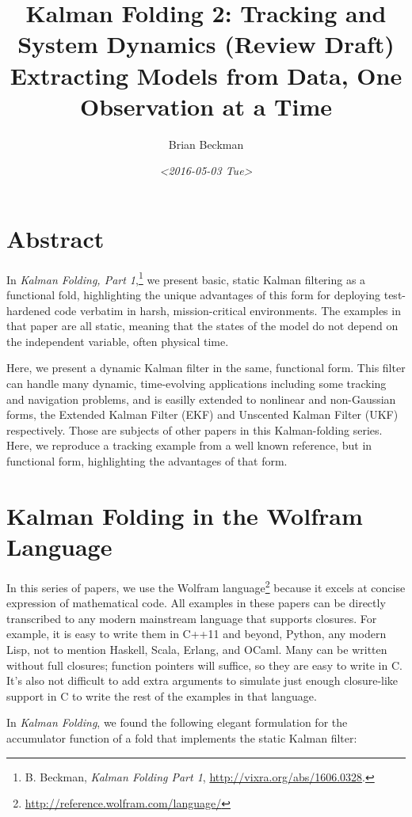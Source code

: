 \documentclass[10pt,oneside,x11names]{article}
\author{Brian Beckman}
\date{\textit{<2016-05-03 Tue>}}
\title{Kalman Folding 2: Tracking and System Dynamics (Review Draft)\\\medskip
\large Extracting Models from Data, One Observation at a Time}
\begin{document}
\maketitle
\setcounter{tocdepth}{2}
\tableofcontents


\section{Abstract}
\label{sec:orgheadline1}

In \emph{Kalman Folding, Part 1},\footnote{B. Beckman, \emph{Kalman Folding Part 1}, \url{http://vixra.org/abs/1606.0328}.} we present basic, static Kalman filtering
as a functional fold, highlighting the unique advantages of this form for
deploying test-hardened code verbatim in harsh, mission-critical environments.
The examples in that paper are all static, meaning that the states of the model
do not depend on the independent variable, often physical time.

Here, we present a dynamic Kalman filter in the same, functional form. This
filter can handle many dynamic, time-evolving applications including some
tracking and navigation problems, and is easilly extended to nonlinear and
non-Gaussian forms, the Extended Kalman Filter (EKF) and Unscented Kalman Filter
(UKF) respectively. Those are subjects of other papers in this Kalman-folding
series. Here, we reproduce a tracking example from a well known reference, but
in functional form, highlighting the advantages of that form.

\section{Kalman Folding in the Wolfram Language}
\label{sec:orgheadline2}

In this series of papers, we use the Wolfram language\footnote{\url{http://reference.wolfram.com/language/}} because it excels
at concise expression of mathematical code. All examples in these papers can be
directly transcribed to any modern mainstream language that supports closures.
For example, it is easy to write them in C++11 and beyond, Python, any modern
Lisp, not to mention Haskell, Scala, Erlang, and OCaml. Many can be written
without full closures; function pointers will suffice, so they are easy to write
in C. It's also not difficult to add extra arguments to simulate just enough
closure-like support in C to write the rest of the examples in that language.

In \emph{Kalman Folding},\footnotemark[1]{} we found the following elegant formulation for the
accumulator function of a fold that implements the static Kalman filter:
\end{document}
